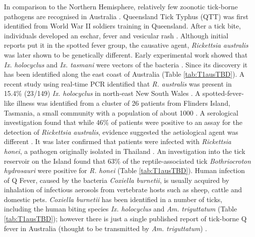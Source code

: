 \documentclass[a4paper, nobind]{templates/ociamthesis}
\begin{document}
In comparison to the Northern Hemisphere, relatively few zoonotic tick-borne pathogens are recognised in Australia \autocite{madison-antenucciEmergingTickBorneDiseases2020,rochlinEmergingTickbornePathogens2020}.
Queensland Tick Typhus (QTT) was first identified from World War II soldiers training in Queensland.
After a tick bite, individuals developed an eschar, fever and vesicular rash \autocite{andrewTickTyphusNorth1946}.
Although initial reports put it in the spotted fever group, the causative agent, \emph{Rickettsia australis} was later shown to be genetically different.
Early experimental work showed that \emph{Ix. holocyclus} and \emph{Ix. tasmani} were vectors of the bacteria \autocite{campbellRickettsiosesAustraliaIsolation1974}.
Since its discovery it has been identified along the east coast of Australia \autocite{campbellQueenslandTickTyphus1979,wilsonQueenslandTickTyphus2013,fergieQueenslandTickTyphus2017} (Table \ref{tab:T1ausTBD}).
A recent study using real-time PCR identified that \emph{R. australis} was present in 15.4\% (23/149) \emph{Ix. holocyclus} in north-east New South Wales \autocite{gravesIxodesHolocyclusTicktransmitted2016}.
A spotted-fever-like illness was identified from a cluster of 26 patients from Flinders Island, Tasmania, a small community with a population of about 1000 \autocite{stewartFlindersIslandSpotted1991}.
A serological investigation found that while 46\% of patients were positive to an assay for the detection of \emph{Rickettsia australis}, evidence suggested the aetiological agent was different \autocite{gravesSpottedFeverGroup1993}.
It was later confirmed that patients were infected with \emph{Rickettsia honei}, a pathogen originally isolated in Thailand \autocite{gravesRickettsiaHonei2003}.
An investigation into the tick reservoir on the Island found that 63\% of the reptile-associated tick \emph{Bothriocroton hydrosauri} were positive for \emph{R. honei} \autocite{stenosAponommaHydrosauriReptileassociated2003} (Table \ref{tab:T1ausTBD}).
Human infection of Q Fever, caused by the bacteria \emph{Coxiella burnetii}, is usually acquired by inhalation of infectious aerosols from vertebrate hosts such as sheep, cattle and domestic pets.
\emph{Coxiella burnetii} has been identified in a number of ticks, including the human biting species \emph{Ix. holocyclus} \autocite{gravesIxodesHolocyclusTicktransmitted2016} and \emph{Am. triguttatum} \autocite{popeCoxiellaBurnetiKangaroos1960,cooperSerologicalEvidenceCoxiella2012} (Table \ref{tab:T1ausTBD}); however there is just a single published report of tick-borne Q fever in Australia (thought to be transmitted by \emph{Am. triguttatum}) \autocite{beamanPericarditisAssociatedTickborne1989}.
\end{document}

